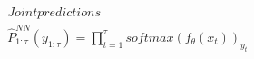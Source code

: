 \documentclass[preview]{standalone}
\begin{document}
\begin{align*}
Joint predictions\\ \hat{P}_{1:\tau}^{NN} (y_{1:\tau}) = \prod_{t=1}^{\tau} softmax (f_\theta (x_t))_{y_t}
\end{align*}
\end{document}
